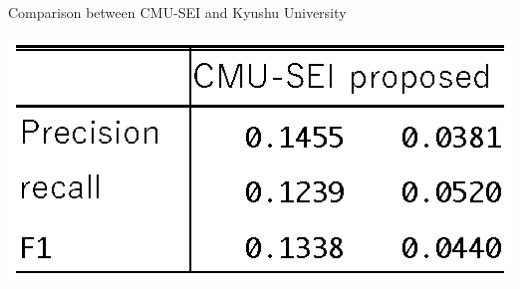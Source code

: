 \documentclass[JIP]{apris}
\begin{document}
\begin{table}[t]
 \centering
 \caption{Comparison between CMU-SEI and Kyushu University}
 \includegraphics[width=1.0\hsize]{image/cmu-pro.eps} 
 \label{table2} 
\end{table}






\end{document}
